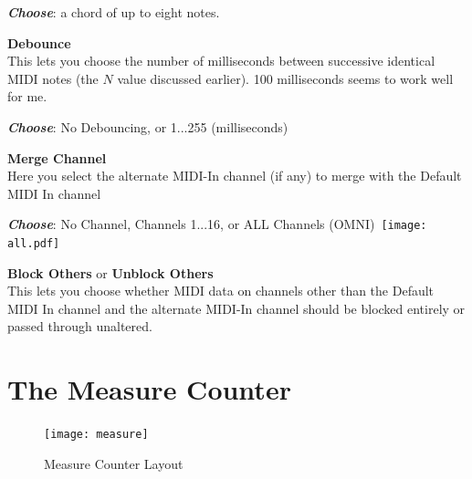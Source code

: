 \documentclass{article}
\begin{document}
\begin{description}
		\begin{description}
		\item{\bf \textit{Choose}}: a chord of up to eight notes.
		\end{description}
		
	\item{\bf Debounce}\\
		This lets you choose the number of milliseconds between successive identical MIDI notes (the \(N\) value discussed earlier).  100 milliseconds seems to work well for me.
		\begin{description}
		\item{\bf \textit{Choose}}: No Debouncing, or 1...255 (milliseconds)\\\rule[0em]{0em}{0em}\hspace{\fill} 
		\end{description}

	\item{\bf Merge Channel}\\
		Here you select the alternate MIDI-In channel (if any) to merge with the Default MIDI In channel
		\begin{description}
		\item{\bf \textit{Choose}}: No Channel, Channels 1...16, or ALL Channels (OMNI)~{\texttt{[image: all.pdf]}}
		\end{description}


	\item{\bf Block Others} or {\bf Unblock Others}\\
		This lets you choose whether MIDI data on channels other than the Default MIDI In channel and the alternate MIDI-In channel should be blocked entirely or passed through unaltered.
				
	\end{description}


\clearpage

\section {The Measure Counter}
\label{measure}

\begin{figure}
\vspace{-1.5em}\texttt{[image: measure]}
\vspace{-2em}\caption{\small Measure Counter Layout}
\vspace{-1em}\label{measurecounter}
\end{figure}
\end{document}
